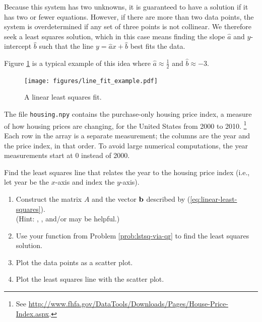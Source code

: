 Because this system has two unknowns, it is guaranteed to have a solution if it has two or fewer equations.
However, if there are more than two data points, the system is overdetermined if any set of three points is not collinear.
We therefore seek a least squares solution, which in this case means finding the slope $\widehat{a}$ and $y$-intercept $\widehat{b}$ such that the line $y = \widehat{a}x+\widehat{b}$ best fits the data.

Figure \ref{fig:line-fit-example} is a typical example of this idea where $\widehat{a} \approx \frac{1}{2}$ and $\widehat{b} \approx -3$.

\begin{figure}[H] %
    \texttt{[image: figures/line\_fit\_example.pdf]}
    \caption{A linear least squares fit.}
    \label{fig:line-fit-example}
\end{figure}

\begin{problem}
The file \texttt{housing.npy} contains the purchase-only housing price index, a measure of how housing prices are changing, for the United States from 2000 to 2010.%
\footnote{See \url{http://www.fhfa.gov/DataTools/Downloads/Pages/House-Price-Index.aspx}.}
Each row in the array is a separate measurement; the columns are the year and the price index, in that order.
To avoid large numerical computations, the year measurements start at 0 instead of 2000.

Find the least squares line that relates the year to the housing price index (i.e., let year be the $x$-axis and index the $y$-axis).

\begin{enumerate}
    \item Construct the matrix $A$ and the vector $\mathbf{b}$ described by (\ref{eq:linear-least-squares}).\\
    (Hint: , , and/or  may be helpful.)
    \item Use your function from Problem \ref{prob:lstsq-via-qr} to find the least squares solution.
    \item Plot the data points as a scatter plot.
    \item Plot the least squares line with the scatter plot.\\
\end{enumerate}
\end{problem}

